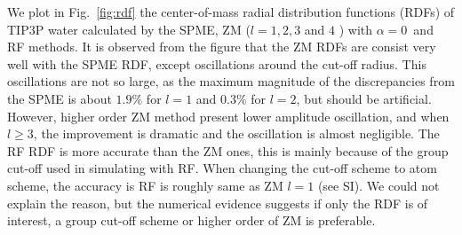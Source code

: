\documentclass[a4paper,preprint,unsortedaddress,onecolumn,fleqn]{revtex4}
\newcommand{\recheck}[1]{{\color{red} #1}}
\begin{document}
We plot in Fig.~\ref{fig:rdf} the center-of-mass radial distribution
functions (RDFs) of TIP3P water calculated by the SPME, ZM ($l=1,2,3$ and $4$%
) with $\alpha =0$\ and RF methods. It is observed from the figure that the
ZM RDFs are consist very well with the SPME RDF, except oscillations around
the cut-off radius. This oscillations are not so large, as the maximum
magnitude of the discrepancies from the SPME is about $1.9\%$ for $l=1$ and $%
{0.3\%}$ for $l=2$, %
but should be artificial. However, higher order ZM method present lower
amplitude oscillation, and when $l\geq 3$, the improvement is dramatic and
the oscillation is almost negligible. \recheck{The RF RDF is more accurate than the ZM ones,
this is mainly because of the group cut-off used in simulating with RF. When changing
the cut-off scheme to atom scheme, the accuracy is RF is roughly same as ZM $l=1$ (see SI).
We could not explain the reason, but the numerical evidence suggests if only the RDF is
of interest, a group cut-off scheme or higher order of ZM is preferable.
}


\end{document}
